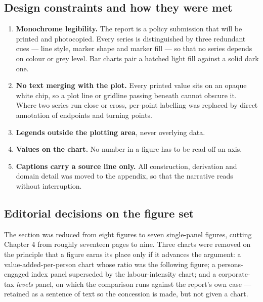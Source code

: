 \documentclass[11pt, a4paper]{article}
\begin{document}
\subsection{Design constraints and how they were met}

\begin{enumerate}[leftmargin=1.6em, itemsep=3pt]
\item \textbf{Monochrome legibility.} The report is a policy submission that will be
printed and photocopied. Every series is distinguished by three redundant cues ---
line style, marker shape and marker fill --- so that no series depends on colour or
grey level. Bar charts pair a hatched light fill against a solid dark one.

\item \textbf{No text merging with the plot.} Every printed value sits on an opaque
white chip, so a plot line or gridline passing beneath cannot obscure it. Where two
series run close or cross, per-point labelling was replaced by direct annotation of
endpoints and turning points.

\item \textbf{Legends outside the plotting area}, never overlying data.

\item \textbf{Values on the chart.} No number in a figure has to be read off an axis.

\item \textbf{Captions carry a source line only.} All construction, derivation and
domain detail was moved to the appendix, so that the narrative reads without
interruption.
\end{enumerate}

\subsection{Editorial decisions on the figure set}

The section was reduced from eight figures to seven single-panel figures, cutting
Chapter 4 from roughly seventeen pages to nine. Three charts were removed on the
principle that a figure earns its place only if it advances the argument: a
value-added-per-person chart whose ratio was the following figure; a persons-engaged
index panel superseded by the labour-intensity chart; and a corporate-tax
\emph{levels} panel, on which the comparison runs against the report's own case ---
retained as a sentence of text so the concession is made, but not given a chart.
\end{document}
